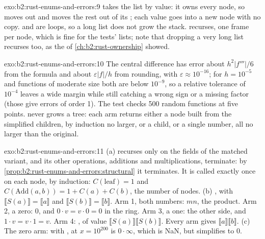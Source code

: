 \begin{solution}{exo:b2:rust-enums-and-errors:9}
 takes the list by value: it owns every node, so  moves  out
and  moves the rest out of its ; each value goes into a new node with no copy.  and
 are loops, so a long list does not grow the stack.  recurses, one frame per node, which is
fine for the tests' lists; note that dropping a very long list recurses too, as the  of
\cref{ch:b2:rust-ownership} showed.
\end{solution}

\begin{solution}{exo:b2:rust-enums-and-errors:10}
The central difference has error about $h^2 |f'''|/6$ from the formula and about $\varepsilon |f| / h$ from
rounding, with $\varepsilon \approx 10^{-16}$; for $h = 10^{-5}$ and functions of moderate size both are below
$10^{-9}$, so a relative tolerance of $10^{-4}$ leaves a wide margin while still catching a wrong sign or a missing
factor (those give errors of order 1). The test checks 500 random functions at five points.  never
grows a tree: each arm returns either a node built from the simplified children, by induction no larger, or a
child, or a single number, all no larger than the original.
\end{solution}

\begin{solution}{exo:b2:rust-enums-and-errors:11}
(a)  recurses only on the fields of the matched variant, and its other operations, additions and
multiplications, terminate: by \cref{prop:b2:rust-enums-and-errors:structural} it terminates. It is called exactly
once on each node, by induction: $C(\text{leaf}) = 1$ and $C(\mathrm{Add}(a, b)) = 1 + C(a) + C(b)$, the number of
nodes. (b) , with $\llbracket S(a) \rrbracket = \llbracket a \rrbracket$ and $\llbracket S(b)
\rrbracket = \llbracket b \rrbracket$. Arm 1, both numbers: $m n$, the product. Arm 2, a zero: $0$, and $0 \cdot v =
v \cdot 0 = 0$ in the ring. Arm 3, a one: the other side, and $1 \cdot v = v \cdot 1 = v$. Arm 4: , of value $\llbracket S(a) \rrbracket \llbracket S(b) \rrbracket$. Every arm gives $\llbracket a \rrbracket
\llbracket b \rrbracket$. (c) The zero arm: with ,  at $x = 10^{200}$ is $0
\cdot \infty$, which is NaN, but simplifies to 0.
\end{solution}

